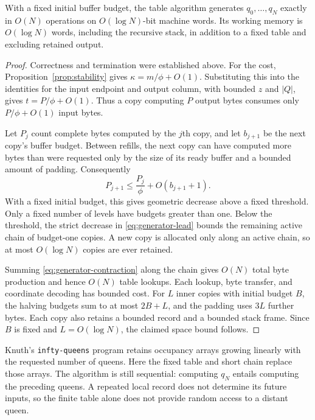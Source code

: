 \begin{proposition}\label{prop:stream-generation}
With a fixed initial buffer budget, the table algorithm generates
$q_0,\ldots,q_N$ exactly in $O(N)$ operations on $O(\log N)$-bit
machine words. Its working memory is $O(\log N)$ words, including
the recursive stack, in addition to a fixed table and excluding
retained output.
\end{proposition}
\begin{proof}
Correctness and termination were established above. For the cost,
Proposition~\ref{prop:stability} gives $\kappa=m/\phi+O(1)$.
Substituting this into the identities for the input endpoint and
output column, with bounded $z$ and $|Q|$, gives $t=P/\phi+O(1)$.
Thus a copy computing $P$ output bytes consumes only $P/\phi+O(1)$
input bytes.

Let $P_j$ count complete bytes computed by the $j$th copy, and let
$b_{j+1}$ be the next copy's buffer budget. Between refills, the next
copy can have computed more bytes than were requested only by the
size of its ready buffer and a bounded amount of padding.
Consequently
\begin{equation}\label{eq:generator-contraction}
 P_{j+1}\le\frac{P_j}{\phi}+O(b_{j+1}+1).
\end{equation}
With a fixed initial budget, this gives geometric decrease above a
fixed threshold. Only a fixed number of levels have budgets greater
than one. Below the threshold, the strict decrease in
\eqref{eq:generator-lead} bounds the remaining active chain of
budget-one copies. A new copy is allocated only along an active
chain, so at most $O(\log N)$ copies are ever retained.

Summing \eqref{eq:generator-contraction} along the chain gives $O(N)$
total byte production and hence $O(N)$ table lookups. Each lookup,
byte transfer, and coordinate decoding has bounded cost. For $L$
inner copies with initial budget $B$, the halving budgets sum to at
most $2B+L$, and the padding uses $3L$ further bytes. Each copy also
retains a bounded record and a bounded stack frame. Since $B$ is
fixed and $L=O(\log N)$, the claimed space bound follows.
\end{proof}

Knuth's \texttt{infty-queens} program \cite{KnuthQueens} retains
occupancy arrays growing linearly with the requested number of
queens. Here the fixed table and short chain replace those arrays.
The algorithm is still sequential: computing $q_N$ entails computing
the preceding queens. A repeated local record does not determine its
future inputs, so the finite table alone does not provide random
access to a distant queen.

